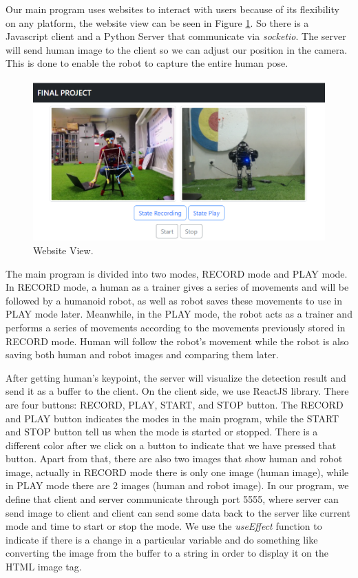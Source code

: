 Our main program uses websites to interact with users because of its flexibility on any platform, the website view can be seen in Figure \ref{fig:websiteview}. So there is a Javascript client and a Python Server that communicate via \emph{socketio}.
The server will send human image to the client so we can adjust our position in the camera. This is done to enable the robot to capture the entire human pose.
\begin{figure}[ht]
  \centering
  \includegraphics[scale=0.7]{gambar/web.png}
  \caption{Website View.}
  \label{fig:websiteview}
\end{figure}
The main program is divided into two modes, RECORD mode and PLAY mode. In RECORD mode, a human as a trainer gives a series of movements and will be followed by a humanoid robot, as well as robot saves these movements to use in PLAY mode later.
Meanwhile, in the PLAY mode, the robot acts as a trainer and performs a series of movements according to the movements previously stored in RECORD mode. Human will follow the robot's movement while the robot is also saving both human and robot images and comparing them later.

After getting human's keypoint, the server will visualize the detection result and send it as a buffer to the client.
On the client side, we use ReactJS library. There are four buttons: RECORD, PLAY, START, and STOP button. The RECORD and PLAY button indicates the modes in the main program, while the START and STOP button tell us when the mode is started or stopped.
There is a different color after we click on a button to indicate that we have pressed that button.
Apart from that, there are also two images that show human and robot image, actually in RECORD mode there is only one image (human image), while in PLAY mode there are 2 images (human and robot image). 
In our program, we define that client and server communicate through port 5555, where server can send image to client and client can send some data back to the server like current mode and time to start or stop the mode.
We use the \emph{useEffect} function to indicate if there is a change in a particular variable and do something like converting the image from the buffer to a string in order to display it on the HTML image tag.


